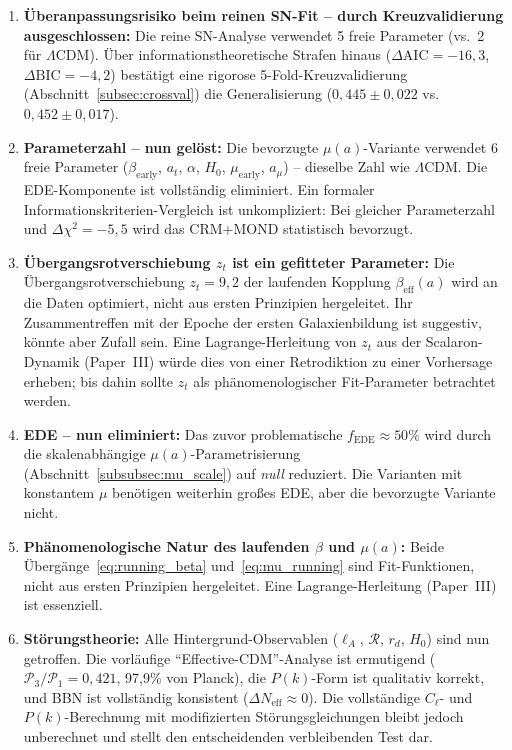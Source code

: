 \documentclass[aps,prd,twocolumn,superscriptaddress,nofootinbib,floatfix]{revtex4-2}
\begin{document}
\begin{enumerate}
\item \textbf{Überanpassungsrisiko beim reinen SN-Fit -- durch Kreuzvalidierung ausgeschlossen:} Die reine SN-Analyse verwendet 5 freie Parameter (vs.\ 2 für $\Lambda$CDM). Über informationstheoretische Strafen hinaus ($\Delta\mathrm{AIC} = -16{,}3$, $\Delta\mathrm{BIC} = -4{,}2$) bestätigt eine rigorose 5-Fold-Kreuzvalidierung (Abschnitt~\ref{subsec:crossval}) die Generalisierung ($0{,}445 \pm 0{,}022$ vs.\ $0{,}452 \pm 0{,}017$).

\item \textbf{Parameterzahl -- nun gelöst:} Die bevorzugte $\mu(a)$-Variante verwendet 6 freie Parameter ($\beta_{\mathrm{early}}$, $a_t$, $\alpha$, $H_0$, $\mu_{\mathrm{early}}$, $a_\mu$) -- dieselbe Zahl wie $\Lambda$CDM. Die EDE-Komponente ist vollständig eliminiert. Ein formaler Informationskriterien-Vergleich ist unkompliziert: Bei gleicher Parameterzahl und $\Delta\chi^2 = -5{,}5$ wird das CRM+MOND statistisch bevorzugt.

\item \textbf{Übergangsrotverschiebung $z_t$ ist ein gefitteter Parameter:} Die Übergangsrotverschiebung $z_t = 9{,}2$ der laufenden Kopplung $\beta_{\mathrm{eff}}(a)$ wird an die Daten optimiert, nicht aus ersten Prinzipien hergeleitet. Ihr Zusammentreffen mit der Epoche der ersten Galaxienbildung ist suggestiv, könnte aber Zufall sein. Eine Lagrange-Herleitung von $z_t$ aus der Scalaron-Dynamik (Paper~III) würde dies von einer Retrodiktion zu einer Vorhersage erheben; bis dahin sollte $z_t$ als phänomenologischer Fit-Parameter betrachtet werden.

\item \textbf{EDE -- nun eliminiert:} Das zuvor problematische $f_{\mathrm{EDE}} \approx 50\%$ wird durch die skalenabhängige $\mu(a)$-Parametrisierung (Abschnitt~\ref{subsubsec:mu_scale}) auf \textit{null} reduziert. Die Varianten mit konstantem $\mu$ benötigen weiterhin großes EDE, aber die bevorzugte Variante nicht.

\item \textbf{Phänomenologische Natur des laufenden $\beta$ und $\mu(a)$:} Beide Übergänge~\eqref{eq:running_beta} und~\eqref{eq:mu_running} sind Fit-Funktionen, nicht aus ersten Prinzipien hergeleitet. Eine Lagrange-Herleitung (Paper~III) ist essenziell.

\item \textbf{Störungstheorie:} Alle Hintergrund-Observablen ($\ell_A$, $\mathcal{R}$, $r_d$, $H_0$) sind nun getroffen. Die vorläufige "`Effective-CDM"'-Analyse ist ermutigend ($\mathcal{P}_3/\mathcal{P}_1 = 0{,}421$, 97,9\% von Planck), die $P(k)$-Form ist qualitativ korrekt, und BBN ist vollständig konsistent ($\Delta N_{\mathrm{eff}} \approx 0$). Die vollständige $C_\ell$- und $P(k)$-Berechnung mit modifizierten Störungsgleichungen bleibt jedoch unberechnet und stellt den entscheidenden verbleibenden Test dar.
\end{enumerate}
\end{document}
